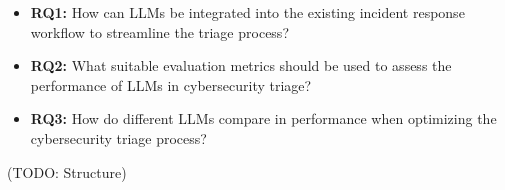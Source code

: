 \begin{itemize}
    \item \textbf{RQ1:} How can LLMs be integrated into the existing incident response workflow to streamline the triage process?
    \item \textbf{RQ2:} What suitable evaluation metrics should be used to assess the performance of LLMs in cybersecurity triage?
    \item \textbf{RQ3:} How do different LLMs compare in performance when optimizing the cybersecurity triage process?
\end{itemize}

(TODO: Structure) %
